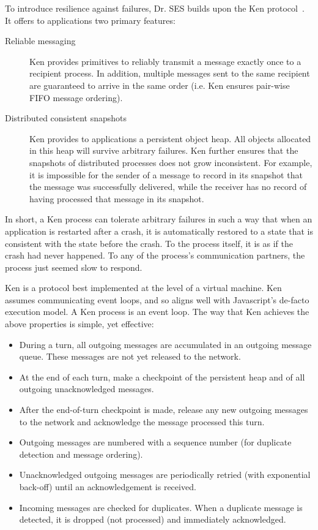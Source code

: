 \documentclass{llncs}
\begin{document}
To introduce resilience against failures, Dr. SES builds upon the Ken protocol~\cite{Yoo:CKen}. It offers to applications two primary features:

\begin{description}
  \item[Reliable messaging] Ken provides primitives to reliably transmit a message exactly once to a recipient process. In addition, multiple messages sent to the same recipient are guaranteed to arrive in the same order (i.e. Ken ensures pair-wise FIFO message ordering).
  \item[Distributed consistent snapshots] Ken provides to applications a persistent object heap. All objects allocated in this heap will survive arbitrary failures. Ken further ensures that the snapshots of distributed processes does not grow inconsistent. For example, it is impossible for the sender of a message to record in its snapshot that the message was successfully delivered, while the receiver has no record of having processed that message in its snapshot.
\end{description}

In short, a Ken process can tolerate arbitrary failures in such a way that when an application is restarted after a crash, it is automatically restored to a state that is consistent with the state before the crash. To the process itself, it is as if the crash had never happened. To any of the process's communication partners, the process just seemed slow to respond.

Ken is a protocol best implemented at the level of a virtual machine. Ken assumes communicating event loops, and so aligns well with Javascript's de-facto execution model. A Ken process is an event loop. The way that Ken achieves the above properties is simple, yet effective:

\begin{itemize}
  \item During a turn, all outgoing messages are accumulated in an outgoing message queue. These messages are not yet released to the network.
  \item At the end of each turn, make a checkpoint of the persistent heap and of all outgoing unacknowledged messages.
  \item After the end-of-turn checkpoint is made, release any new outgoing messages to the network and acknowledge the message processed this turn.
  \item Outgoing messages are numbered with a sequence number (for duplicate detection and message ordering).
  \item Unacknowledged outgoing messages are periodically retried (with exponential back-off) until an acknowledgement is received.
  \item Incoming messages are checked for duplicates. When a duplicate message is detected, it is dropped (not processed) and immediately acknowledged.
\end{itemize}
\end{document}
